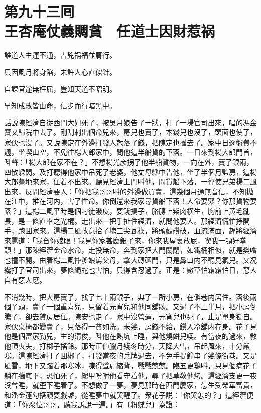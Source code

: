
\chapter*{第九十三囘　\\王杏庵仗義賙貧　任道士因財惹祸}


\begin{myquote}
誰道人生運不通，吉兇祸福並肩行。

只因風月將身陷，未許人心直似針。

自課官途無枉屈，豈知天道不昭明。

早知成敗皆由命，信步而行暗黑中。
\end{myquote}

話説陳經濟自従西門大姐死了，被吳月娘告了一狀，打了一場官司出來，唱的馮金寳又歸院中去了。剛刮剌出個命兒來，房兒也賣了，本錢兒也沒了，頭面也使了，家伙也沒了。又說陳定在外邊打發人尅落了錢，把陳定也攆去了。家中日逐盤費不週，坐喫山空，不免往楊大郎家中，問他這半船貨的下落。一日來到楊大郎門首，呌聲：「楊大郎在家不在？」不想楊光彦拐了他半船貨物，一向在外，賣了銀兩，四散躱閃。及打聽得他家中吊死了老婆，他丈母縣中告他，坐了半個月監房，這楊大郎驀地來家，住着不出來。聽見經濟上門呌他，問貨船下落，一徑使兄弟楊二風出來，反問經濟要人：「你把我哥哥呌的外邊做買賣，這幾個月通無音信，不知拋在江中，推在河内，害了性命。你倒還來我家尋貨船下落！人命要緊？你那貨物要緊？」這楊二風平時是個刁徒潑皮，耍錢搗子，胳膊上紫肉横生，胸前上黄毛亂長，是一條直率之光棍。走出來一把手扯住經濟，就問他要人。那經濟慌忙掙開手，跑囬家來。這楊二風故意拾了塊三尖瓦楔，將頭顱礸破，血流滿面，趕將經濟來罵道：「我㒲你娘眼！我見你家甚麽銀子來，你來我屋裏放屁，喫我一頓好拳頭！」那陳經濟金命水命，走投無命，奔到家把大門關閉，如鐵桶相似，就是樊噲也撞不開。由着楊二風摔爹娘罵父母，拿大磚砸門，只是鼻口内不聽見氣兒。又况纔打了官司出來，夢條䋲蛇也害怕，只得含忍過了。正是：嫩草怕霜霜怕日，惡人自有惡人磨。

不消幾時，把大房賣了，找了七十兩銀子，典了一所小房，在僻巷内居住。落後兩個丫頭，賣了一個重喜兒，只留着元宵兒和他同舖歇。又過了不上半月，把小房倒騰了，卻去賃房居住。陳安也走了，家中沒營運，元宵兒也死了，止是單身獨自。家伙桌椅都變賣了，只落得一貧如洗。未幾，房錢不給，鑽入冷舖内存身。花子見他是個富家勤兒，生的清俊，呌他在熱坑上睡，與他燒餅兒喫。有當夜的過來，敎他頂火夫，打梆子搖鈴。那時正値臘月殘冬時分，天降大雪，吊起風來，十分嚴寒。這陳經濟打了囬梆子，打發當夜的兵牌過去，不免手提鈴串了幾條街巷。又是風雪，地下又踏着那寒冰，凍得聳肩縮背，戰戰兢兢。臨五更鷄呌，只見個病花子躺在牆底下，恐怕死了，總甲吩咐他看守着他，尋了把草敎他烤。這經濟支更一夜沒曾睡，就歪下睡着了。不想做了一夢，夢見那時在西門慶家，怎生受榮華富貴，和潘金蓮勾搭頑耍戯謔，從睡夢中就哭醒了。衆花子説：「你哭怎的？」這經濟便道：「你衆位哥哥，聽我訴說一遍。」有〔粉蝶兒〕為證：

